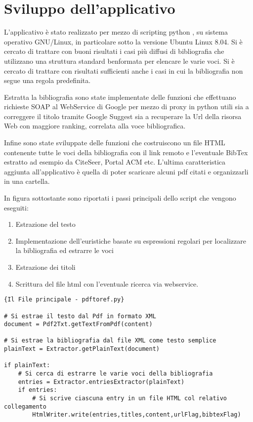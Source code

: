 \section{Sviluppo dell'applicativo} \label{software}

L'applicativo è stato realizzato per mezzo di scripting python \cite{pydoc}, su sistema operativo GNU/Linux, in particolare sotto la versione Ubuntu Linux 8.04. Si è cercato di trattare con buoni risultati i casi più diffusi di bibliografia che utilizzano una struttura standard benformata per elencare le varie voci. Si è cercato di trattare con risultati sufficienti anche i casi in cui la bibliografia non segue una regola predefinita.

Estratta la bibliografia sono state implementate delle funzioni che effettuano richieste SOAP al WebService di Google \cite{GWS} per mezzo di proxy in python \cite{ibm-py-ws} utili sia a correggere il titolo tramite Google Suggest sia a recuperare la Url della risorsa Web con maggiore ranking, correlata alla voce bibliografica. 

Infine sono state sviluppate delle funzioni che costruiscono un file HTML contenente tutte le voci della bibliografia con il link remoto e l'eventuale BibTex estratto ad esempio da CiteSeer, Portal ACM etc. L'ultima caratteristica aggiunta all'applicativo è quella di poter scaricare alcuni pdf citati e organizzarli in una cartella.

In figura sottostante sono riportati i passi principali dello script che vengono eseguiti:
\begin{enumerate}
	\item Estrazione del testo
	\item Implementazione dell'euristiche basate su espressioni regolari per localizzare la bibliografia ed estrarre le voci
	\item Estrazione dei titoli
	\item Scrittura del file html con l'eventuale ricerca via webservice. 
\end{enumerate}


\begin{lstlisting}[frame=r,caption=\textit{Il File principale - pdftoref.py },breaklines=true,basicstyle=\small]{Il File principale - pdftoref.py}

# Si estrae il testo dal Pdf in formato XML
document = Pdf2Txt.getTextFromPdf(content)

# Si estrae la bibliografia dal file XML come testo semplice
plainText = Extractor.getPlainText(document)

if plainText:
	# Si cerca di estrarre le varie voci della bibliografia 
	entries = Extractor.entriesExtractor(plainText)
	if entries:
		# Si scrive ciascuna entry in un file HTML col relativo collegamento
		HtmlWriter.write(entries,titles,content,urlFlag,bibtexFlag)

\end{lstlisting}

